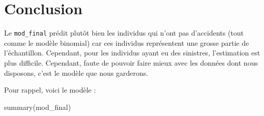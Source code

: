 \documentclass[
]{article}
\newenvironment{Shaded}{\begin{snugshade}}{\end{snugshade}}
\newcommand{\FunctionTok}[1]{\textcolor[rgb]{0.00,0.00,0.00}{#1}}
\newcommand{\NormalTok}[1]{#1}
\begin{document}
\hypertarget{conclusion}{%
\section{Conclusion}\label{conclusion}}

Le \texttt{mod\_final} prédit plutôt bien les individus qui n'ont pas
d'accidents (tout comme le modèle binomial) car ces individus
représentent une grosse partie de l'échantillon. Cependant, pour les
individus ayant eu des sinistres, l'estimation est plus difficile.
Cependant, faute de pouvoir faire mieux avec les données dont nous
disposons, c'est le modèle que nous garderons.

Pour rappel, voici le modèle :

\begin{Shaded}
\begin{Highlighting}[]
\FunctionTok{summary}\NormalTok{(mod\_final)}
\end{Highlighting}
\end{Shaded}
\end{document}
